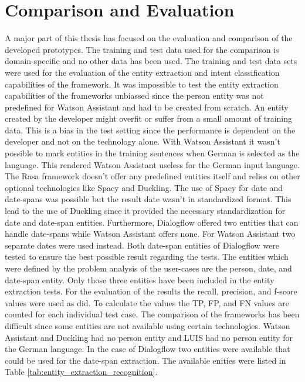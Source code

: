 \section{Comparison and Evaluation}\label{sec:comparison_and_eval}
A major part of this thesis has focused on the evaluation and comparison of the 
developed prototypes.
The training and test data used for the comparison is domain-specific and no other 
data has been used.
The training and test data sets were used for the evaluation of the entity extraction and 
intent classification capabilities of the framework.
It was impossible to test the entity extraction capabilities of the frameworks unbiassed since 
the person entity was not predefined for Watson Assistant and had to be created from scratch.
An entity created by the developer might overfit or suffer from a small amount of training data.
This is a bias in the test setting since the performance is dependent on the developer and not 
on the technology alone.
With Watson Assistant it wasn't possible to mark entities in the training sentences when 
German is selected as the language.
This rendered Watson Assistant useless for the German input language.  
The Rasa framework doesn't offer any predefined entities itself and relies on other 
optional technologies like Spacy and Duckling.
The use of Spacy for date and date-spans was possible but the result date wasn't in standardized 
format.
This lead to the use of Duckling since it provided the necessary standardization for date and 
date-span entities.
Furthermore, Dialogflow offered two entities that can handle date-spans while 
Watson Assistant offers none.
For Watson Assistant two separate dates were used instead.
Both date-span entities of Dialogflow were tested to ensure the best possible 
result regarding the tests.
The entities which were defined by the problem analysis of the user-cases are 
the person, date, and date-span entity.
Only those three entities have been included in the entity extraction tests.
For the evaluation of the results the recall, precision, and f-score values were used 
as \citet{braunEvaluatingNLU} did.
To calculate the values the TP, FP, and FN values are counted for each individual test case.
The comparison of the frameworks has been difficult since some entities are not available 
using certain technologies.
Watson Assistant and Duckling had no person entity and LUIS had no person entity for the 
German language.
In the case of Dialogflow two entities were available that could be used for the date-span 
extraction.
The available enities were listed in Table \ref{tab:entity_extraction_recognition}.
